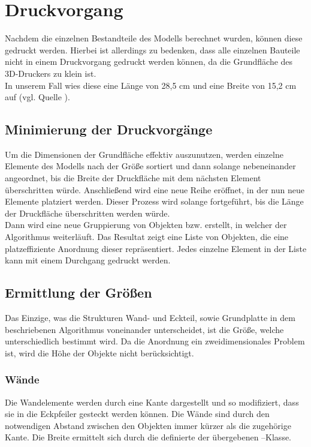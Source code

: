 \section{Druckvorgang}
Nachdem die einzelnen Bestandteile des Modells berechnet wurden, können diese gedruckt werden.
Hierbei ist allerdings zu bedenken, dass alle einzelnen Bauteile nicht in einem Druckvorgang gedruckt werden können, da die Grundfläche des 3D-Druckers zu klein ist. \\
In unserem Fall wies diese eine Länge von 28,5 cm und eine Breite von 15,2 cm auf (vgl. Quelle \cite{makerbotspecs}).

\subsection{Minimierung der Druckvorgänge}
Um die Dimensionen der Grundfläche effektiv auszunutzen, werden einzelne Elemente des Modells nach der Größe sortiert und dann solange nebeneinander angeordnet, bis die Breite der Druckfläche mit dem nächsten Element überschritten würde.
Anschließend wird eine neue Reihe eröffnet, in der nun neue Elemente platziert werden. 
Dieser Prozess wird solange fortgeführt, bis die Länge der Druckfläche überschritten werden würde. \\
Dann wird eine neue Gruppierung von Objekten bzw.  erstellt, in welcher der Algorithmus weiterläuft.
Das Resultat zeigt eine Liste von Objekten, die eine platzeffiziente Anordnung dieser repräsentiert.
Jedes einzelne Element in der Liste kann mit einem Durchgang gedruckt werden.

\subsection{Ermittlung der Größen}
Das Einzige, was die Strukturen Wand- und Eckteil, sowie Grundplatte in dem beschriebenen Algorithmus voneinander unterscheidet, ist die Größe, welche unterschiedlich bestimmt wird.
Da die Anordnung ein zweidimensionales Problem ist, wird die Höhe der Objekte nicht berücksichtigt.

\subsubsection{Wände}
Die Wandelemente werden durch eine Kante dargestellt und so modifiziert, dass sie in die Eckpfeiler gesteckt werden können.
Die Wände sind durch den notwendigen Abstand zwischen den Objekten immer kürzer als die zugehörige Kante. 
Die Breite ermittelt sich durch die definierte  der übergebenen --Klasse.

